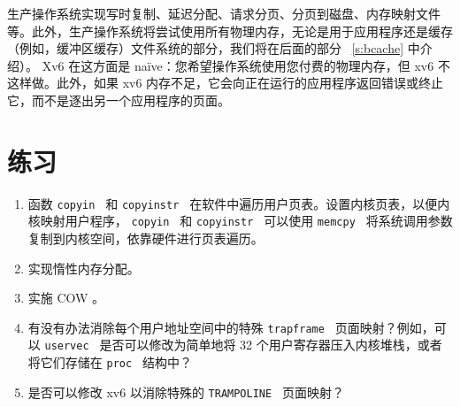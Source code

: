 生产操作系统实现写时复制、延迟分配、请求分页、分页到磁盘、内存映射文件等。此外，生产操作系统将尝试使用所有物理内存，无论是用于应用程序还是缓存（例如，缓冲区缓存）文件系统的部分，我们将在后面的部分~    \ref{s:bcache}    中介绍）。 Xv6 在这方面是 na\"{i}ve：您希望操作系统使用您付费的物理内存，但 xv6 不这样做。此外，如果 xv6 内存不足，它会向正在运行的应用程序返回错误或终止它，而不是逐出另一个应用程序的页面。  

   \section{练习  }     

   \begin{enumerate}


   \item   函数  {    \tt    copyin   }  和  {    \tt    copyinstr   }   在软件中遍历用户页表。设置内核页表，以便内核映射用户程序， {    \tt    copyin   }  和  {    \tt    copyinstr   }   可以使用  {    \tt    memcpy   }  将系统调用参数复制到内核空间，依靠硬件进行页表遍历。   \item   实现惰性内存分配。   \item   实施 COW 。   \item   有没有办法消除每个用户地址空间中的特殊  {    \tt    trapframe   }  页面映射？例如，可以
  {    \tt    uservec   }  是否可以修改为简单地将 32 个用户寄存器压入内核堆栈，或者将它们存储在  {    \tt    proc   }  结构中？   \item   是否可以修改 xv6 以消除特殊的  {    \tt    TRAMPOLINE   }  页面映射？  \end{enumerate}     


